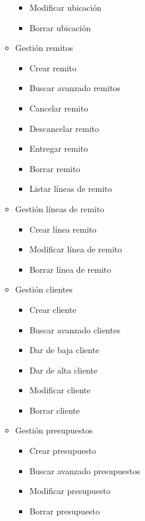 \begin{itemize}
\begin{itemize}
\begin{itemize}
                \item Modificar ubicación
                \item Borrar ubicación
            \end{itemize}
            \item Gestión remitos
            \begin{itemize}
                \item Crear remito
                \item Buscar avanzado remitos
                \item Cancelar remito
                \item Descancelar remito
                \item Entregar remito
                \item Borrar remito
                \item Listar líneas de remito
            \end{itemize}
            \item Gestión líneas de remito
            \begin{itemize}
                \item Crear línea remito
                \item Modificar línea de remito
                \item Borrar línea de remito
            \end{itemize}
            \item Gestión clientes
            \begin{itemize}
                \item Crear cliente
                \item Buscar avanzado clientes
                \item Dar de baja cliente
                \item Dar de alta cliente
                \item Modificar cliente
                \item Borrar cliente
            \end{itemize}
            \item Gestión presupuestos
            \begin{itemize}
                \item Crear presupuesto
                \item Buscar avanzado presupuestos
                \item Modificar presupuesto
                \item Borrar presupuesto

\end{itemize}
\end{itemize}
\end{itemize}
